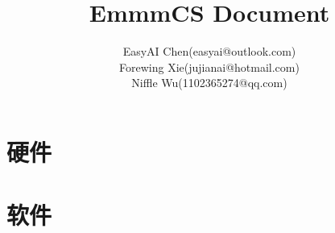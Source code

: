 \documentclass[10pt,fancyhdr,UTF8]{ctexbook}
\title{EmmmCS Document}
\author{
        EasyAI Chen(easyai@outlook.com)\\
        Forewing Xie(jujianai@hotmail.com)\\
        Niffle Wu(1102365274@qq.com)
    }
\begin{document}
\begin{sloppypar}
\maketitle
\tableofcontents
\mainmatter

\part{硬件}






\part{软件}

\end{sloppypar}
\end{document}
